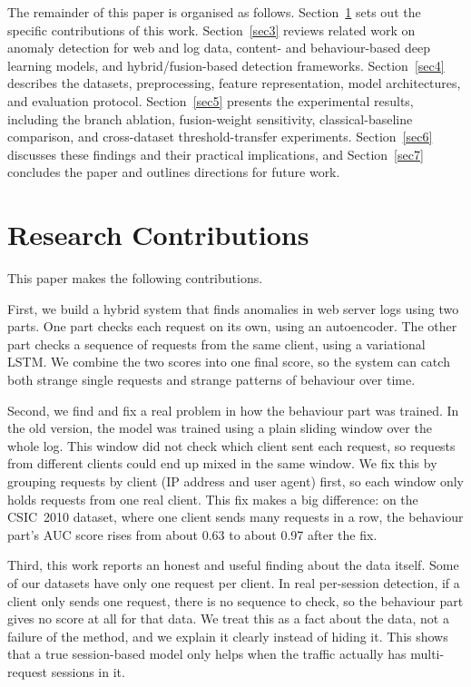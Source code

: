 \documentclass[futureinternet,article,submit,moreauthors]{Definitions/mdpi}
\begin{document}
The remainder of this paper is organised as follows. Section~\ref{sec2} sets out the specific contributions of this work. Section~\ref{sec3} reviews related work on anomaly detection for web and log data, content- and behaviour-based deep learning models, and hybrid/fusion-based detection frameworks. Section~\ref{sec4} describes the datasets, preprocessing, feature representation, model architectures, and evaluation protocol. Section~\ref{sec5} presents the experimental results, including the branch ablation, fusion-weight sensitivity, classical-baseline comparison, and cross-dataset threshold-transfer experiments. Section~\ref{sec6} discusses these findings and their practical implications, and Section~\ref{sec7} concludes the paper and outlines directions for future work.

\section{Research Contributions} \label{sec2}

This paper makes the following contributions.

First, we build a hybrid system that finds anomalies in web server logs using two parts. One part checks each request on its own, using an autoencoder. The other part checks a sequence of requests from the same client, using a variational LSTM. We combine the two scores into one final score, so the system can catch both strange single requests and strange patterns of behaviour over time.

Second, we find and fix a real problem in how the behaviour part was trained. In the old version, the model was trained using a plain sliding window over the whole log. This window did not check which client sent each request, so requests from different clients could end up mixed in the same window. We fix this by grouping requests by client (IP address and user agent) first, so each window only holds requests from one real client. This fix makes a big difference: on the CSIC~2010 dataset, where one client sends many requests in a row, the behaviour part's AUC score rises from about 0.63 to about 0.97 after the fix.

Third, this work reports an honest and useful finding about the data itself. Some of our datasets have only one request per client. In real per-session detection, if a client only sends one request, there is no sequence to check, so the behaviour part gives no score at all for that data. We treat this as a fact about the data, not a failure of the method, and we explain it clearly instead of hiding it. This shows that a true session-based model only helps when the traffic actually has multi-request sessions in it.
\end{document}
